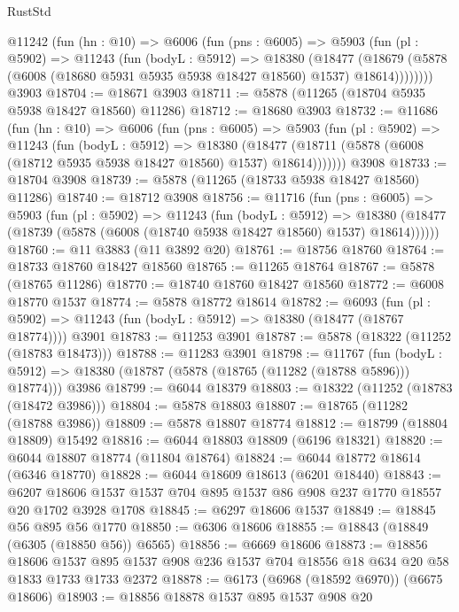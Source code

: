 \begin{lexlean}{RustStd}
\begin{coremodule}
    @11242
      (fun (hn : @10) =>
      @6006
        (fun (pns : @6005) =>
        @5903
          (fun (pl : @5902) =>
          @11243
            (fun (bodyL : @5912) =>
            @18380
              (@18477
                (@18679 (@5878 (@6008 (@18680 @5931 @5935 @5938 @18427 @18560) @1537) @18614))))))))
    @3903
@18704 := @18671 @3903
@18711 := @5878 (@11265 (@18704 @5935 @5938 @18427 @18560) @11286)
@18712 := @18680 @3903
@18732 := @11686
    (fun (hn : @10) =>
    @6006
      (fun (pns : @6005) =>
      @5903
        (fun (pl : @5902) =>
        @11243
          (fun (bodyL : @5912) =>
          @18380
            (@18477 (@18711 (@5878 (@6008 (@18712 @5935 @5938 @18427 @18560) @1537) @18614)))))))
    @3908
@18733 := @18704 @3908
@18739 := @5878 (@11265 (@18733 @5938 @18427 @18560) @11286)
@18740 := @18712 @3908
@18756 := @11716
    (fun (pns : @6005) =>
    @5903
      (fun (pl : @5902) =>
      @11243
        (fun (bodyL : @5912) =>
        @18380 (@18477 (@18739 (@5878 (@6008 (@18740 @5938 @18427 @18560) @1537) @18614))))))
@18760 := @11 @3883 (@11 @3892 @20)
@18761 := @18756 @18760
@18764 := @18733 @18760 @18427 @18560
@18765 := @11265 @18764
@18767 := @5878 (@18765 @11286)
@18770 := @18740 @18760 @18427 @18560
@18772 := @6008 @18770 @1537
@18774 := @5878 @18772 @18614
@18782 := @6093
    (fun (pl : @5902) => @11243 (fun (bodyL : @5912) => @18380 (@18477 (@18767 @18774))))
    @3901
@18783 := @11253 @3901
@18787 := @5878 (@18322 (@11252 (@18783 @18473)))
@18788 := @11283 @3901
@18798 := @11767
    (fun (bodyL : @5912) => @18380 (@18787 (@5878 (@18765 (@11282 (@18788 @5896))) @18774)))
    @3986
@18799 := @6044 @18379
@18803 := @18322 (@11252 (@18783 (@18472 @3986)))
@18804 := @5878 @18803
@18807 := @18765 (@11282 (@18788 @3986))
@18809 := @5878 @18807 @18774
@18812 := @18799 (@18804 @18809) @15492
@18816 := @6044 @18803 @18809 (@6196 @18321)
@18820 := @6044 @18807 @18774 (@11804 @18764)
@18824 := @6044 @18772 @18614 (@6346 @18770)
@18828 := @6044 @18609 @18613 (@6201 @18440)
@18843 := @6207 @18606 @1537 @1537 @704 @895 @1537 @86 @908 @237 @1770 @18557 @20 @1702 @3928 @1708
@18845 := @6297 @18606 @1537
@18849 := @18845 @56 @895 @56 @1770
@18850 := @6306 @18606
@18855 := @18843 (@18849 (@6305 (@18850 @56)) @6565)
@18856 := @6669 @18606
@18873 := @18856
    @18606
    @1537
    @895
    @1537
    @908
    @236
    @1537
    @704
    @18556
    @18
    @634
    @20
    @58
    @1833
    @1733
    @1733
    @2372
@18878 := @6173 (@6968 (@18592 @6970)) (@6675 @18606)
@18903 := @18856
    @18878
    @1537
    @895
    @1537
    @908
    @20

\end{coremodule}
\end{lexlean}
